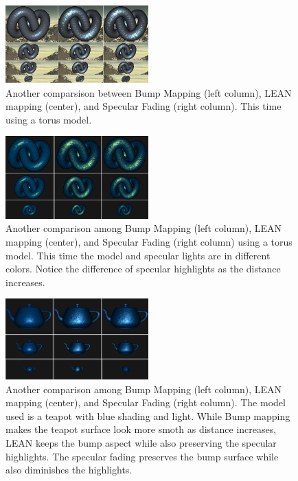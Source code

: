 \documentclass[10pt, conference]{IEEEtran}
\begin{document}
\begin{figure}[H]
	\includegraphics[width=0.49\textwidth]{figs/BLS3.png}
	\caption{Another comparsison between Bump Mapping (left column), LEAN mapping (center), and Specular Fading (right column). This time using a torus model.}
	\label{fig:BLS3}
\end{figure}

\begin{figure}[H]
	\includegraphics[width=0.49\textwidth]{figs/BLS4.png}
	\caption{Another comparison among Bump Mapping (left column), LEAN mapping (center), and Specular Fading (right column) using a torus model. This time the model and specular lights are in different colors. Notice the difference of specular highlights as the distance increases.}
	\label{fig:BLS4}
\end{figure}

\begin{figure}[H]
	\includegraphics[width=0.49\textwidth]{figs/BLS5.png}
	\caption{Another comparison among Bump Mapping (left column), LEAN mapping (center), and Specular Fading (right column). The model used is a teapot with blue shading and light. While Bump mapping makes the teapot surface look more smoth as distance increases, LEAN keeps the bump aspect while also preserving the specular highlights. The specular fading preserves the bump surface while also diminishes the highlights.}
	\label{fig:BLS5}
\end{figure}
\end{document}
